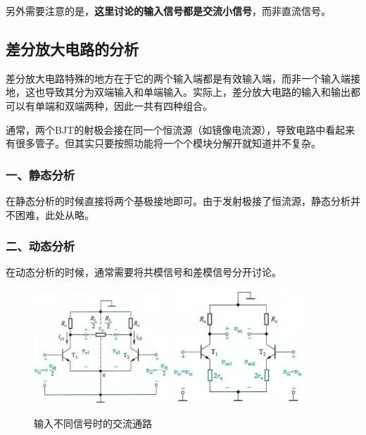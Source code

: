 另外需要注意的是，\textbf{这里讨论的输入信号都是交流小信号}，而非直流信号。

\subsection{差分放大电路的分析}
差分放大电路特殊的地方在于它的两个输入端都是有效输入端，而非一个输入端接地，这也导致其分为双端输入和单端输入。实际上，差分放大电路的输入和输出都可以有单端和双端两种，因此一共有四种组合。

通常，两个BJT的射极会接在同一个恒流源（如镜像电流源），导致电路中看起来有很多管子。但其实只要按照功能将一个个模块分解开就知道并不复杂。

\subsubsection{一、静态分析}
在静态分析的时候直接将两个基极接地即可。由于发射极接了恒流源，静态分析并不困难，此处从略。

\subsubsection{二、动态分析}
在动态分析的时候，通常需要将共模信号和差模信号分开讨论。

\begin{figure}[htb]
    \centering
        {\includegraphics[width=0.45\textwidth]{pic/输入差模信号时的交流通路.png}}\qquad
        {\includegraphics[width=0.45\textwidth]{pic/输入共模信号时的交流通路.png}}
        \caption{输入不同信号时的交流通路\label{输入不同信号时的交流通路}}
\end{figure}

